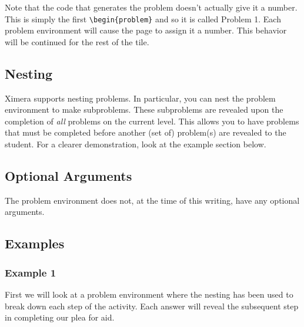 \documentclass{ximera}
\begin{document}
        Note that the code that generates the problem doesn't actually give it a number.  This is simply the first \verb|\begin{problem}| and so it is called Problem 1.  Each problem environment will cause the page to assign it a number.  This behavior will be continued for the rest of the tile.
    
    \subsection*{Nesting}
    
        Ximera supports nesting problems. In particular, you can nest the problem environment to make subproblems. These subproblems are revealed upon the completion of \textit{all} problems on the current level. This allows you to have problems that must be completed before another (set of) problem(s) are revealed to the student. For a clearer demonstration, look at the example section below.

    \subsection*{Optional Arguments}
    
        The problem environment does not, at the time of this writing, have any optional arguments.
    
    \subsection*{Examples}
    
        \subsubsection*{Example 1}
            First we will look at a problem environment where the nesting has been used to break down each step of the activity.  Each answer will reveal the subsequent step in completing our plea for aid.
            
\end{document}
